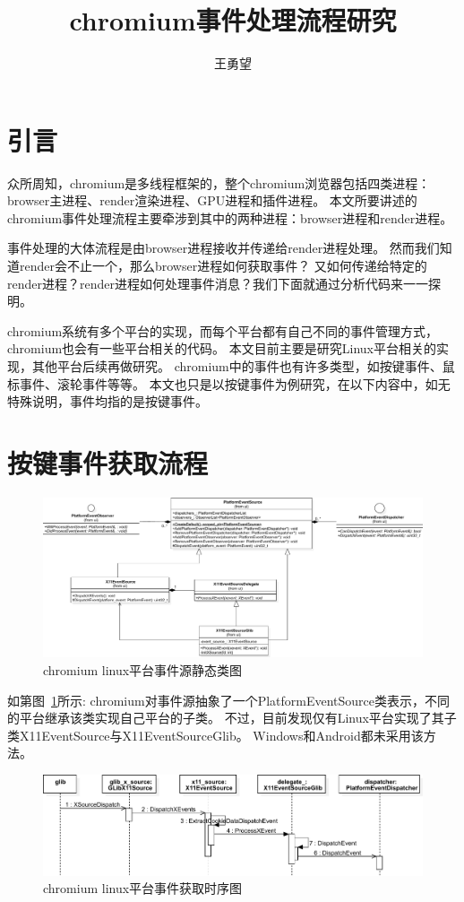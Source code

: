 \documentclass[12pt]{article}
\title{chromium事件处理流程研究}
\author{王勇望}
\begin{document}
\maketitle
\newpage

\section{引言}
众所周知，chromium是多线程框架的，整个chromium浏览器包括四类进程：browser主进程、render渲染进程、GPU进程和插件进程。
本文所要讲述的chromium事件处理流程主要牵涉到其中的两种进程：browser进程和render进程。

事件处理的大体流程是由browser进程接收并传递给render进程处理。
然而我们知道render会不止一个，那么browser进程如何获取事件？
又如何传递给特定的render进程？render进程如何处理事件消息？我们下面就通过分析代码来一一探明。

chromium系统有多个平台的实现，而每个平台都有自己不同的事件管理方式，chromium也会有一些平台相关的代码。
本文目前主要是研究Linux平台相关的实现，其他平台后续再做研究。
chromium中的事件也有许多类型，如按键事件、鼠标事件、滚轮事件等等。
本文也只是以按键事件为例研究，在以下内容中，如无特殊说明，事件均指的是按键事件。

\section{按键事件获取流程}
\begin{figure}[H] 
  \centering 
  \includegraphics[width=\textwidth]{image/event_source_class.pdf} 
  \caption{chromium linux平台事件源静态类图} \label{fig:event_source_class} 
\end{figure}

如第图~\ref{fig:event_source_class}所示:
chromium对事件源抽象了一个PlatformEventSource类表示，不同的平台继承该类实现自己平台的子类。
不过，目前发现仅有Linux平台实现了其子类X11EventSource与X11EventSourceGlib。
Windows和Android都未采用该方法。

\begin{figure}[H] 
  \centering 
  \includegraphics[width=\textwidth]{image/linux_event_dispatch_sequence_0.pdf} 
  \caption{chromium linux平台事件获取时序图} \label{fig:linux_event_dispatch_sequence_0} 
\end{figure}
\end{document}
